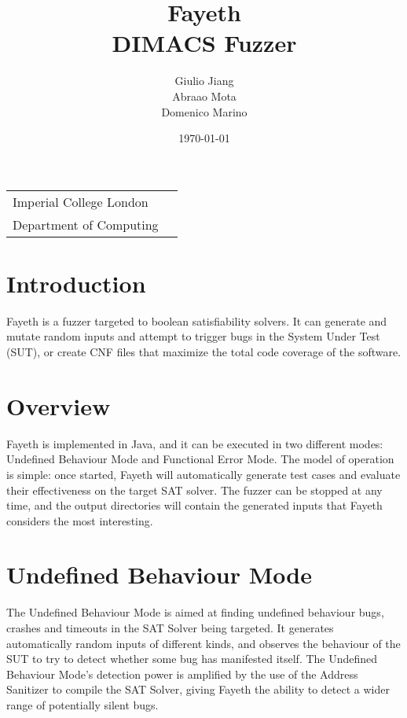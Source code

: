 \documentclass{article}
\title{Fayeth \\ DIMACS Fuzzer} %
\author{Giulio Jiang \\ Abraao Mota \\ Domenico Marino} %
\date{\today} %
\begin{document}
\maketitle %

\begin{center}
\begin{tabular}{l r}
Imperial College London \\
Department of Computing \\
\end{tabular}
\end{center}


\newpage



\section{Introduction}

Fayeth is a fuzzer targeted to boolean satisfiability solvers. It can generate and mutate 
random inputs and attempt to trigger bugs in the System Under Test (SUT), or create CNF files 
that maximize the total code coverage of the software.

\section{Overview}

Fayeth is implemented in Java, and it can be executed in two different modes: 
Undefined Behaviour Mode and Functional Error Mode. The model of operation is simple: 
once started, Fayeth will automatically generate test cases and evaluate their 
effectiveness on the target SAT solver. The fuzzer can be stopped at any time, 
and the output directories will contain the generated inputs that Fayeth considers 
the most interesting.

\section{Undefined Behaviour Mode}

The Undefined Behaviour Mode is aimed at finding undefined behaviour bugs, crashes and timeouts in the
SAT Solver being targeted. It generates automatically random inputs of different kinds,
and observes the behaviour of the SUT to try to detect whether some bug has manifested itself.
The Undefined Behaviour Mode's detection power is amplified by the use of the Address
Sanitizer to compile the SAT Solver, giving Fayeth the ability to detect a wider range of
potentially silent bugs.\\
\end{document}
